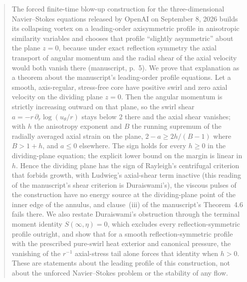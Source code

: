 \documentclass[11pt]{article}
\begin{document}
\hypnosmaketitle

\begin{abstract}
The forced finite-time blow-up construction for the three-dimensional Navier--Stokes equations released by OpenAI on September 8, 2026 builds its collapsing vortex on a leading-order axisymmetric profile in anisotropic similarity variables and chooses that profile ``slightly asymmetric'' about the plane $z=0$, because under exact reflection symmetry the axial transport of angular momentum and the radial shear of the axial velocity would both vanish there (manuscript, p.~5). We prove that explanation as a theorem about the manuscript's leading-order profile equations. Let a smooth, axis-regular, stress-free core have positive swirl and zero axial velocity on the dividing plane $z=0$. Then the angular momentum is strictly increasing outward on that plane, so the swirl shear $a=-r\,\partial_r\log(u_\theta/r)$ stays below $2$ there and the axial shear vanishes; with $h$ the anisotropy exponent and $B$ the running supremum of the radially averaged axial strain on the plane, $2-a\ge2h/(B-1)$ where $B>1+h$, and $a\le0$ elsewhere. The sign holds for every $h\ge0$ in the dividing-plane equation; the explicit lower bound on the margin is linear in $h$. Hence the dividing plane has the sign of Rayleigh's centrifugal criterion that forbids growth, with Ludwieg's axial-shear term inactive (this reading of the manuscript's shear criterion is Duraiswami's), the viscous pulses of the construction have no energy source at the dividing-plane point of the inner edge of the annulus, and clause~(iii) of the manuscript's Theorem~4.6 fails there. We also restate Duraiswami's obstruction through the terminal moment identity $S(\infty,\eta)=0$, which excludes every reflection-symmetric profile outright, and show that for a smooth reflection-symmetric profile with the prescribed pure-swirl heat exterior and canonical pressure, the vanishing of the $r^{-1}$ axial-stress tail alone forces that identity when $h>0$. These are statements about the leading profile of this construction, not about the unforced Navier--Stokes problem or the stability of any flow.
\end{abstract}
\end{document}
